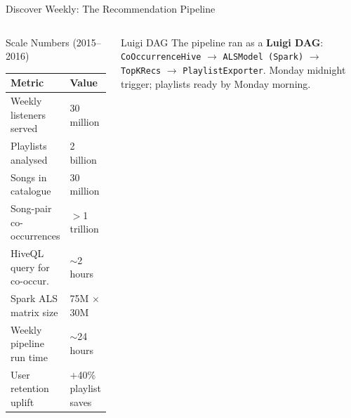 \documentclass[aspectratio=169,10pt]{beamer}
\begin{document}
\begin{frame}{Discover Weekly: The Recommendation Pipeline}
\begin{columns}[T]
      \begin{block}{Scale Numbers (2015--2016)}
        \renewcommand{\arraystretch}{1.25}
        \begin{tabular}{@{}ll@{}}
          \toprule
          \textbf{Metric}              & \textbf{Value} \\
          \midrule
          Weekly listeners served      & 30 million \\
          Playlists analysed           & 2 billion \\
          Songs in catalogue           & 30 million \\
          Song-pair co-occurrences     & $>$1 trillion \\
          HiveQL query for co-occur.   & $\sim$2 hours \\
          Spark ALS matrix size        & 75M $\times$ 30M \\
          Weekly pipeline run time     & $\sim$24 hours \\
          User retention uplift        & $+$40\% playlist saves \\
          \bottomrule
        \end{tabular}
      \end{block}
      \vspace{4pt}
      \begin{alertblock}{Luigi DAG}
        The pipeline ran as a \textbf{Luigi DAG}:
        \texttt{CoOccurrenceHive} $\to$
        \texttt{ALSModel (Spark)} $\to$
        \texttt{TopKRecs} $\to$
        \texttt{PlaylistExporter}.
        Monday midnight trigger; playlists ready by Monday morning.
      \end{alertblock}
  \end{columns}
\end{frame}
\end{document}
